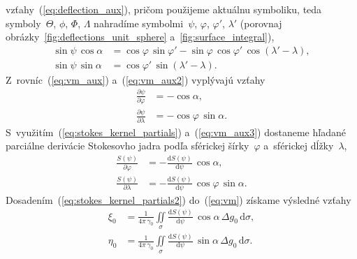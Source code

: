 \documentclass[a4paper, 12pt]{book}
\newcommand{\diff}{\mathrm d}
\begin{document}
vzťahy~(\ref{eq:deflection_aux}), pričom použijeme aktuálnu symboliku, teda 
symboly~$\Theta$, $\phi$, $\Phi$, $\Lambda$ nahradíme symbolmi~$\psi$, 
$\varphi$, $\varphi'$, $\lambda'$ (porovnaj 
obrázky~\ref{fig:deflections_unit_sphere} a~\ref{fig:surface_integral}),
%
\begin{equation}
\label{eq:vm_aux2}
\begin{split}
\sin\psi \, \cos\alpha &= \cos\varphi \, \sin\varphi' - \sin\varphi \, 
\cos\varphi' \, \cos(\lambda' - \lambda){,}\\
\sin\psi \, \sin\alpha &= \cos\varphi' \, \sin(\lambda' - \lambda){.}
\end{split}
\end{equation}
%
Z~rovníc~(\ref{eq:vm_aux}) a~(\ref{eq:vm_aux2}) vyplývajú vzťahy
%
\begin{equation}
\label{eq:vm_aux3}
\begin{split}
\frac{\partial\psi}{\partial\varphi} &= -\cos\alpha{,}\\
%
\frac{\partial\psi}{\partial\lambda} &= -\cos\varphi \, \sin\alpha{.}
\end{split}
\end{equation}
%
S~využitím~(\ref{eq:stokes_kernel_partials}) a~(\ref{eq:vm_aux3}) dostaneme 
hľadané parciálne derivácie Stokesovho jadra podľa sférickej šírky~$\varphi$ 
a~sférickej dĺžky~$\lambda$,
%
\begin{equation}
\label{eq:stokes_kernel_partials2}
\begin{split}
\frac{S(\psi)}{\partial\varphi} &= -\frac{\diff S(\psi)}{\diff \psi} \, 
\cos\alpha{,}\\
%
\frac{S(\psi)}{\partial\lambda} &= -\frac{\diff S(\psi)}{\diff \psi} \, 
\cos\varphi \, \sin\alpha{.}
\end{split}
\end{equation}
%
Dosadením~(\ref{eq:stokes_kernel_partials2}) do~(\ref{eq:vm}) získame výsledné 
vzťahy
%
\begin{equation}
\label{eq:vm2}
\begin{split}
\xi_0 &= \frac{1}{4\pi\,\gamma_0} \iint\limits_\sigma \frac{\diff 
S(\psi)}{\diff \psi} \, \cos\alpha \, \Delta g_0 \, \diff\sigma{,}\\
\eta_0 &= \frac{1}{4\pi\,\gamma_0} \iint\limits_\sigma \frac{\diff 
S(\psi)}{\diff \psi} \, \sin\alpha \, \Delta g_0 \, \diff\sigma{.}
\end{split}
\end{equation}
\end{document}
